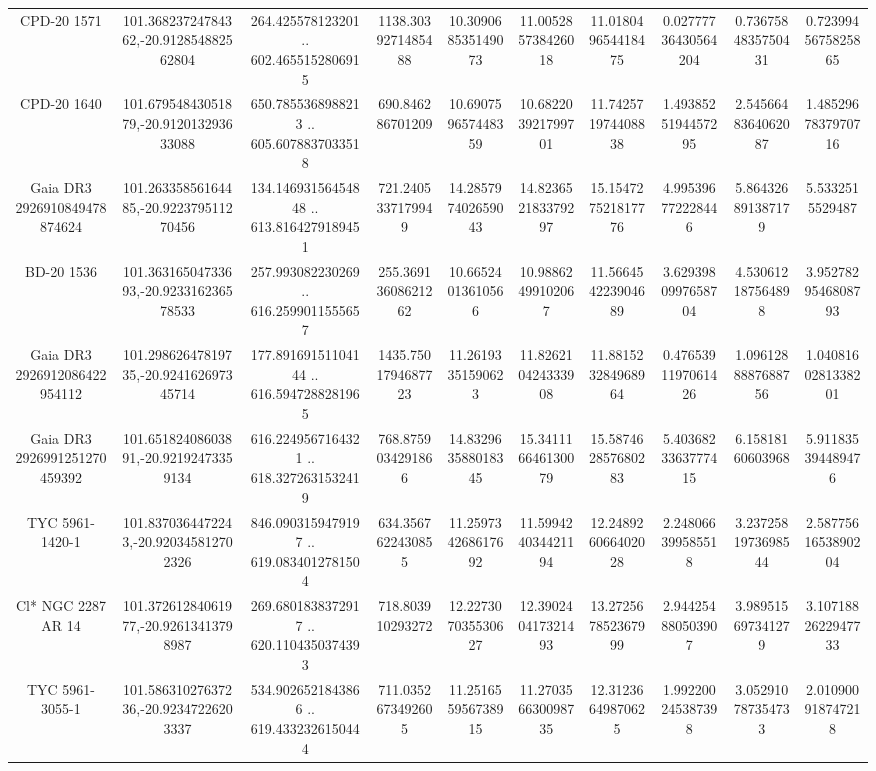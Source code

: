 \begin{table}
\begin{tabular}{cccccccccc}
CPD-20  1571 & 101.36823724784362,-20.912854882562804 & 264.425578123201 .. 602.4655152806915 & 1138.3039271485488 & 10.309068535149073 & 11.005285738426018 & 11.018049654418475 & 0.02777736430564204 & 0.7367584835750431 & 0.7239945675825865 \\
CPD-20  1640 & 101.67954843051879,-20.912013293633088 & 650.7855368988213 .. 605.6078837033518 & 690.846286701209 & 10.690759657448359 & 10.682203921799701 & 11.742571974408838 & 1.4938525194457295 & 2.5456648364062087 & 1.4852967837970716 \\
Gaia DR3 2926910849478874624 & 101.26335856164485,-20.922379511270456 & 134.14693156454848 .. 613.8164279189451 & 721.2405337179949 & 14.285797402659043 & 14.823652183379297 & 15.154727521817776 & 4.995396772228446 & 5.864326891387179 & 5.5332515529487 \\
BD-20  1536 & 101.36316504733693,-20.923316236578533 & 257.993082230269 .. 616.2599011555657 & 255.36913608621262 & 10.66524013610566 & 10.98862499102067 & 11.566454223904689 & 3.6293980997658704 & 4.530612187564898 & 3.9527829546808793 \\
Gaia DR3 2926912086422954112 & 101.29862647819735,-20.924162697345714 & 177.89169151104144 .. 616.5947288281965 & 1435.7501794687723 & 11.26193351590623 & 11.826210424333908 & 11.881523284968964 & 0.4765391197061426 & 1.0961288887688756 & 1.0408160281338201 \\
Gaia DR3 2926991251270459392 & 101.65182408603891,-20.92192473359134 & 616.2249567164321 .. 618.3272631532419 & 768.8759034291866 & 14.832963588018345 & 15.341116646130079 & 15.587462857680283 & 5.4036823363777415 & 6.15818160603968 & 5.911835394489476 \\
TYC 5961-1420-1 & 101.8370364472243,-20.920345812702326 & 846.0903159479197 .. 619.0834012781504 & 634.3567622430855 & 11.259734268617692 & 11.599424034421194 & 12.248926066402028 & 2.248066399585518 & 3.2372581973698544 & 2.5877561653890204 \\
Cl* NGC 2287     AR      14 & 101.37261284061977,-20.92613413798987 & 269.6801838372917 .. 620.1104350374393 & 718.803910293272 & 12.227307035530627 & 12.390240417321493 & 13.272567852367999 & 2.944254880503907 & 3.989515697341279 & 3.1071882622947733 \\
TYC 5961-3055-1 & 101.58631027637236,-20.92347226203337 & 534.9026521843866 .. 619.4332326150444 & 711.0352673492605 & 11.251655956738915 & 11.270356630098735 & 12.31236649870625 & 1.992200245387398 & 3.052910787354733 & 2.010900918747218 \\

\end{tabular}
\end{table}
